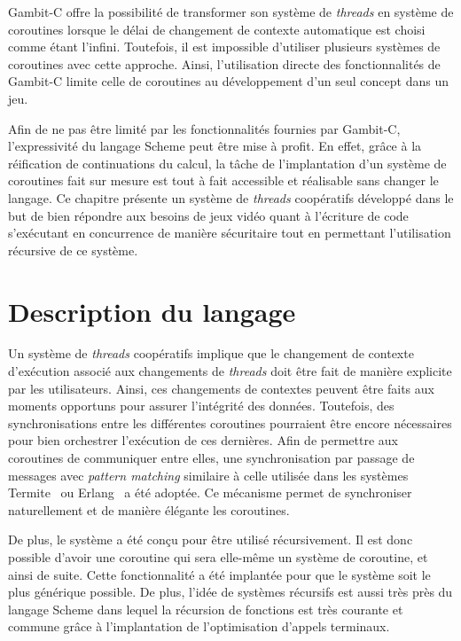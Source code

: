 \documentclass[12pt,twoside,letterpaper,francais]{book}
\begin{document}
Gambit-C offre la possibilité de transformer son système de
\textit{threads} en système de coroutines lorsque le délai de
changement de contexte automatique est choisi comme étant
l'infini. Toutefois, il est impossible d'utiliser plusieurs systèmes
de coroutines avec cette approche. Ainsi, l'utilisation directe des
fonctionnalités de Gambit-C limite celle de coroutines au
dévelop\-pement d'un seul concept dans un jeu.

Afin de ne pas être limité par les fonctionnalités fournies par
Gambit-C, l'expressivité du langage Scheme peut être mise à profit. En
effet, grâce à la réification de continuations du calcul, la tâche de
l'implantation d'un système de coroutines fait sur mesure est tout à
fait accessible et réalisable sans changer le langage. Ce chapitre
présente un système de \textit{threads} coopératifs développé dans le
but de bien répondre aux besoins de jeux vidéo quant à l'écriture de
code s'exécutant en concurrence de manière sécuritaire tout en
permettant l'utilisation récursive de ce système.


\FloatBarrier
\section{Description du langage}
Un système de \textit{threads} coopératifs implique que le changement
de contexte d'exécution associé aux changements de \textit{threads}
doit être fait de manière explicite par les utilisateurs. Ainsi, ces
changements de contextes peuvent être faits aux moments opportuns pour
assurer l'intégrité des données. Toutefois, des synchronisations entre
les différentes coroutines pourraient être encore nécessaires pour
bien orchestrer l'exécution de ces dernières. Afin de permettre aux
coroutines de communiquer entre elles, une synchronisation par passage
de messages avec \textit{pattern matching} similaire à celle utilisée
dans les systèmes Termite~\cite{Termite_paper} ou Erlang~\cite{Erlang}
a été adoptée. Ce mécanisme permet de synchroniser naturellement et de
manière élégante les coroutines.

De plus, le système a été conçu pour être utilisé récursivement. Il
est donc possible d'avoir une coroutine qui sera elle-même un système
de coroutine, et ainsi de suite. Cette fonctionnalité a été implantée
pour que le système soit le plus générique possible. De plus, l'idée
de systèmes récursifs est aussi très près du langage Scheme dans
lequel la récursion de fonctions est très courante et commune grâce à
l'implantation de l'optimisation d'appels terminaux.
\end{document}

